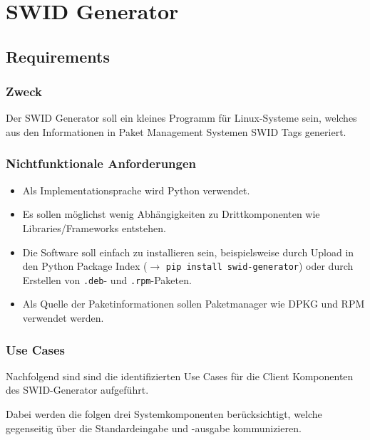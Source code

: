 \chapter{SWID Generator}


\section{Requirements}

\subsection{Zweck}

Der SWID Generator soll ein kleines Programm für Linux-Systeme sein, welches aus
den Informationen in Paket Management Systemen SWID Tags generiert.

\subsection{Nichtfunktionale Anforderungen}

\begin{itemize}
		\item Als Implementationsprache wird Python verwendet.
		\item Es sollen möglichst wenig Abhängigkeiten zu Drittkomponenten wie
			Libraries/Frameworks entstehen.
    \item Die Software soll einfach zu installieren sein, beispielsweise durch
			Upload in den Python Package Index ($\rightarrow$ \texttt{pip install
			swid-generator}) oder durch Erstellen von \texttt{.deb}- und
			\texttt{.rpm}-Paketen.
		\item Als Quelle der Paketinformationen sollen Paketmanager wie DPKG und RPM
			verwendet werden.
\end{itemize}

\subsection{Use Cases}

Nachfolgend sind sind die identifizierten Use Cases für die Client Komponenten
des SWID-Generator aufgeführt.

Dabei werden die folgen drei Systemkomponenten berücksichtigt, welche
gegenseitig über die Standardeingabe und -ausgabe kommunizieren.

\vspace{1em}

